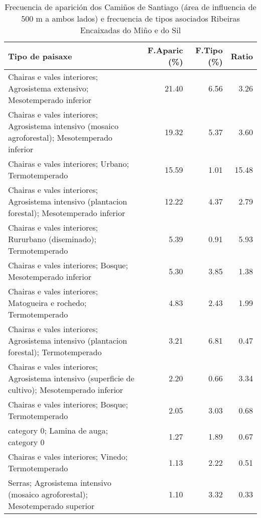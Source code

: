 \begin{table}[p]
\centering
\caption{Frecuencia de aparición dos Camiños de Santiago (área de influencia de 500 m a ambos lados) e frecuencia de tipos asociados Ribeiras Encaixadas do Miño e do Sil} 
\label{vcamino4}
\begin{tabular}{lrrr}
  \hline
Tipo de paisaxe & F.Aparic (\%) & F.Tipo (\%) & Ratio \\ 
  \hline
Chairas e vales interiores; Agrosistema extensivo; Mesotemperado inferior & 21.40 & 6.56 & 3.26 \\ 
  Chairas e vales interiores; Agrosistema intensivo (mosaico agroforestal); Mesotemperado inferior & 19.32 & 5.37 & 3.60 \\ 
  Chairas e vales interiores; Urbano; Termotemperado & 15.59 & 1.01 & 15.48 \\ 
  Chairas e vales interiores; Agrosistema intensivo (plantacion forestal); Mesotemperado inferior & 12.22 & 4.37 & 2.79 \\ 
  Chairas e vales interiores; Rururbano (diseminado); Termotemperado & 5.39 & 0.91 & 5.93 \\ 
  Chairas e vales interiores; Bosque; Mesotemperado inferior & 5.30 & 3.85 & 1.38 \\ 
  Chairas e vales interiores; Matogueira e rochedo; Termotemperado & 4.83 & 2.43 & 1.99 \\ 
  Chairas e vales interiores; Agrosistema intensivo (plantacion forestal); Termotemperado & 3.21 & 6.81 & 0.47 \\ 
  Chairas e vales interiores; Agrosistema intensivo (superficie de cultivo); Mesotemperado inferior & 2.20 & 0.66 & 3.34 \\ 
  Chairas e vales interiores; Bosque; Termotemperado & 2.05 & 3.03 & 0.68 \\ 
  category 0; Lamina de auga; category 0 & 1.27 & 1.89 & 0.67 \\ 
  Chairas e vales interiores; Vinedo; Termotemperado & 1.13 & 2.22 & 0.51 \\ 
  Serras; Agrosistema intensivo (mosaico agroforestal); Mesotemperado superior & 1.10 & 3.32 & 0.33 \\ 
   \hline
\end{tabular}
\end{table}
